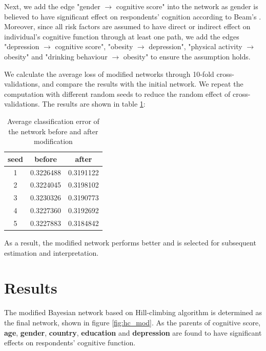 \documentclass[11pt,twoside]{article}
\numberwithin{Theorem}{section}
\numberwithin{Definition}{section}
\numberwithin{Lemma}{section}
\numberwithin{Algorithm}{section}
\numberwithin{equation}{section}
\begin{document}
Next, we add the edge "gender $\rightarrow$ cognitive score" into the network as gender is believed to have significant effect on respondents' cognition according to Beam's \cite{beam2018differences}. Moreover, since all risk factors are assumed to have direct or indirect effect on individual's cognitive function through at least one path, we add the edges "depression $\rightarrow$ cognitive score", "obesity $\rightarrow$ depression", "physical activity $\rightarrow$ obesity" and "drinking behaviour $\rightarrow$ obesity" to ensure the assumption holds. 

We calculate the average loss of modified networks through 10-fold cross-validations, and compare the results with the initial network. We repeat the computation with different random seeds to reduce the random effect of cross-validations. The results are shown in table \ref{tab:hc}:

\begin{table}[!h]
	\centering
	\begin{tabular}{|c|c|c|}
		\hline
		seed & before & after \\
		\hline
		1 & 0.3226488 & 0.3191122 \\
		2 & 0.3224045 & 0.3198102 \\
		3 & 0.3230326 & 0.3190773 \\
		4 & 0.3227360 & 0.3192692 \\
		5 & 0.3227883 & 0.3184842 \\
		\hline
	\end{tabular}
	\caption{Average classification error of the network before and after modification}
	\label{tab:hc}
\end{table}

As a result, the modified network performs better and is selected for subsequent estimation and interpretation.

\clearpage

\section{Results}
\label{sec:results}

The modified Bayesian network based on Hill-climbing algorithm is determined as the final network, shown in figure \ref{fig:hc_mod}.  As the parents of cognitive score, \textbf{age}, \textbf{gender}, \textbf{country}, \textbf{education} and \textbf{depression} are found to have significant effects on respondents' cognitive function. 
\end{document}
